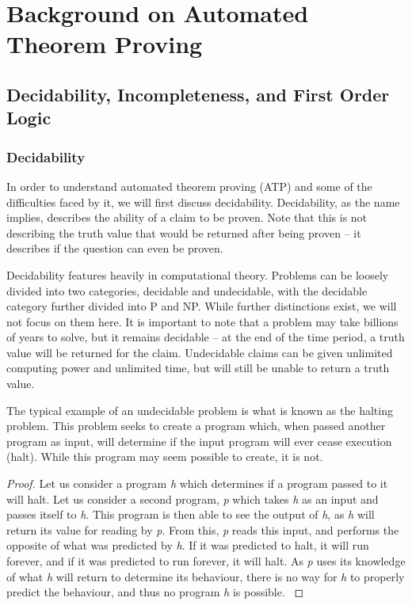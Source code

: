 \chapter{Background on Automated Theorem Proving}

\section{Decidability, Incompleteness, and First Order Logic}
\subsection{Decidability}
In order to understand automated theorem proving (ATP) and some of the difficulties faced by it, we will first discuss decidability. Decidability, as the name implies, describes the ability of a claim to be proven. Note that this is not describing the truth value that would be returned after being proven -- it describes if the question can even be proven. 

Decidability features heavily in computational theory. Problems can be loosely divided into two categories, decidable and undecidable, with the decidable category further divided into P and NP. While further distinctions exist, we will not focus on them here. It is important to note that a problem may take billions of years to solve, but it remains decidable -- at the end of the time period, a truth value will be returned for the claim. Undecidable claims can be given unlimited computing power and unlimited time, but will still be unable to return a truth value.

The typical example of an undecidable problem is what is known as the halting problem. This problem seeks to create a program which, when passed another program as input, will determine if the input program will ever cease execution (halt). While this program may seem possible to create, it is not.

\begin{proof}
Let us consider a program \textit{h} which determines if a program passed to it will halt. Let us consider a second program, \textit{p} which takes \textit{h} as an input and passes itself to \textit{h}. This program is then able to see the output of \textit{h}, as \textit{h} will return its value for reading by \textit{p}. From this, \textit{p} reads this input, and performs the opposite of what was predicted by \textit{h}. If it was predicted to halt, it will run forever, and if it was predicted to run forever, it will halt. As \textit{p} uses its knowledge of what \textit{h} will return to determine its behaviour, there is no way for \textit{h} to properly predict the behaviour, and thus no program \textit{h} is possible. \cite{haltProof}
\end{proof}


